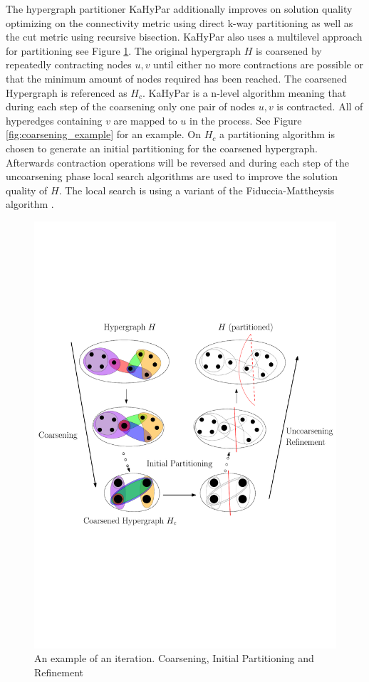 \documentclass[a4paper,12pt,titlepage, BCOR7mm,headsepline]{scrbook}
\numberwithin{equation}{section}
\begin{document}
The hypergraph partitioner KaHyPar additionally improves on solution quality optimizing on the connectivity metric using direct k-way partitioning \cite{akhremtsev2017engineering} as well as the cut metric using recursive bisection\cite{schlag2016k}.  
KaHyPar also uses a multilevel approach for partitioning see Figure \ref{fig:coarseningexample}. The original hypergraph $H$ is coarsened by repeatedly contracting nodes $u,v$ until either no more contractions are possible or that the minimum amount of nodes required has been reached. The coarsened Hypergraph is referenced as $H_c$. KaHyPar is a n-level algorithm meaning that during each step of the coarsening only one pair of nodes $u, v$ is contracted. All of hyperedges containing $v$ are mapped to $u$ in the process. See Figure \ref{fig:coarsening_example} for an example. 
On $H_c$ a partitioning algorithm is chosen to generate an initial partitioning for the coarsened hypergraph. Afterwards contraction operations will be reversed and 
during each step of the uncoarsening phase local search algorithms are used to improve the solution quality of $H$. The local search is using a variant of the Fiduccia-Mattheysis algorithm \cite{fiduccia1988linear}. 
\newline
\begin{figure}[H] 
    \vspace*{-.25cm}
  \centering
   \includegraphics[width=.8\textwidth]{Ipe/Memetic_process.pdf}
  \caption{An example of an iteration. Coarsening, Initial Partitioning and Refinement}\label{fig:coarseningexample} %

\end{figure}
\end{document}
